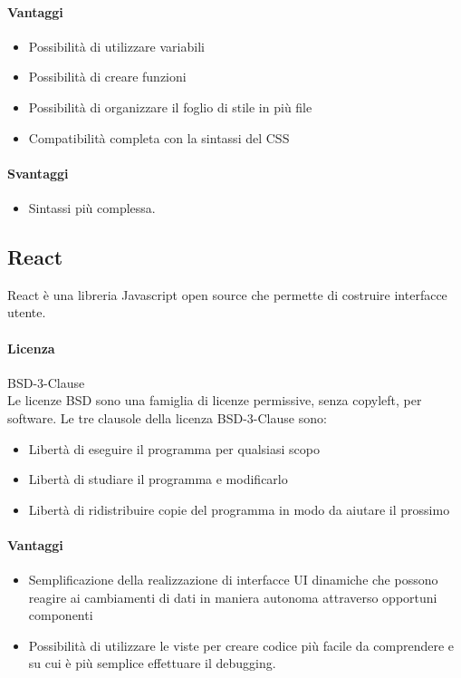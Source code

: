 \paragraph{Vantaggi}
\begin{itemize}
	\item Possibilità di utilizzare variabili
	\item Possibilità di creare funzioni 
	\item Possibilità di organizzare il foglio di stile in più file
	\item Compatibilità completa con la sintassi del CSS
\end{itemize}

\paragraph{Svantaggi} 
\begin{itemize}
	\item  Sintassi più complessa.
\end{itemize}

\subsection{React}

React è una libreria Javascript open source che permette di costruire interfacce utente. 
\\
\paragraph{Licenza} BSD-3-Clause \\
Le licenze BSD sono una famiglia di licenze permissive, senza copyleft, per software.
Le tre clausole della licenza BSD-3-Clause sono:
\\
\begin{itemize}
	\item Libertà di eseguire il programma per qualsiasi scopo
	\item Libertà di studiare il programma e modificarlo
	\item Libertà di ridistribuire copie del programma in modo da aiutare il prossimo
	
\end{itemize}

\paragraph{Vantaggi}
\begin{itemize}
	\item Semplificazione della realizzazione di interfacce UI dinamiche che possono reagire ai cambiamenti di dati in maniera autonoma attraverso opportuni componenti
	\item Possibilità di utilizzare le viste per creare codice più facile da comprendere e su cui è più semplice effettuare il debugging.
	
\end{itemize}

